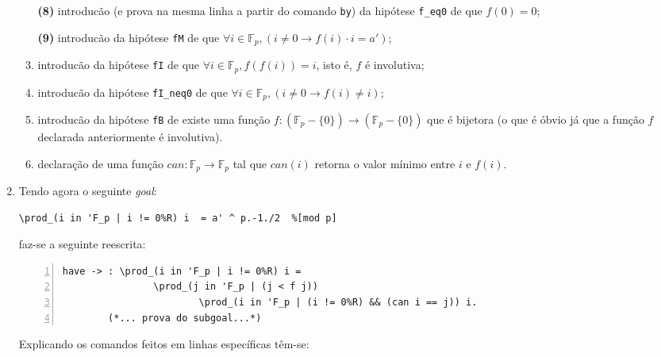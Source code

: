 \begin{enumerate}[label=\textbf{\roman*.}]
\begin{enumerate}
                \item[\textbf{(8)}] introducão (e prova na mesma linha a partir do comando \lstinline[language=coq]|by|) da hipótese \lstinline[language=coq]|f_eq0| de que $f(0) = 0$;
                
                \item[\textbf{(9)}] introducão da hipótese \lstinline[language=coq]|fM| de que $\forall i \in \mathbb{F}_p, (i \neq 0 \rightarrow f(i) \cdot i = a')$;
                
                \item[\textbf{(11)}] introducão da hipótese \lstinline[language=coq]|fI| de que $\forall i \in \mathbb{F}_p, f(f(i)) = i$, isto é, $f$ é involutiva;
                
                \item[\textbf{(13)}] introducão da hipótese \lstinline[language=coq]|fI_neq0| de que $\forall i \in \mathbb{F}_p, (i \neq 0 \rightarrow f(i) \neq i)$;
                
                \item[\textbf{(15)}] introducão da hipótese \lstinline[language=coq]|fB| de existe uma função $f : (\mathbb{F}_p - \{0\}) \rightarrow (\mathbb{F}_p - \{0\})$ que é bijetora (o que é óbvio já que a função $f$ declarada anteriormente é involutiva).
                
                \item[\textbf{(17)}] declaração de uma função $can : \mathbb{F}_p \rightarrow \mathbb{F}_p$ tal que $can(i)$ retorna o valor mínimo entre $i$ e $f(i)$.
        \end{enumerate}

        \item Tendo agora o seguinte \textit{goal}:
                \begin{lstlisting}[language=coq,frame=single,tabsize=1]
\prod_(i in 'F_p | i != 0%R) i  = a' ^ p.-1./2  %[mod p]
                \end{lstlisting}
        faz-se a seguinte reescrita:
                \begin{lstlisting}[language=coq,frame=single, numbers=left,stepnumber=1,tabsize=1]
have -> : \prod_(i in 'F_p | i != 0%R) i =
                \prod_(j in 'F_p | (j < f j))
                        \prod_(i in 'F_p | (i != 0%R) && (can i == j)) i.
        (*... prova do subgoal...*)
                \end{lstlisting}
        Explicando os comandos feitos em linhas específicas têm-se:
        \begin{enumerate}


\end{enumerate}
\end{enumerate}
